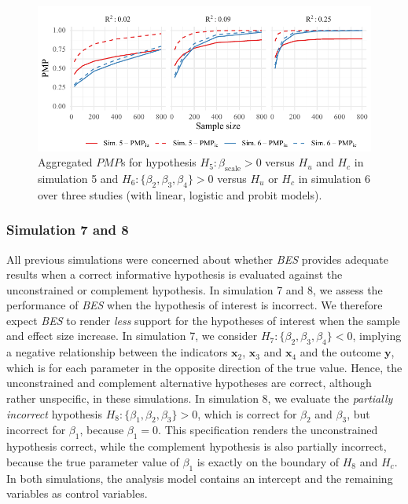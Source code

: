 \documentclass[
]{article}
\begin{document}
\begin{figure}[!t]

{\centering \includegraphics[width=1\textwidth,height=\textheight]{manuscript_VK_files/figure-pdf/fig-PMP56-1.pdf}

}

\caption{\label{fig-PMP56}Aggregated \(PMP\)s for hypothesis
\(H_5: \beta_{\text{scale}} > 0\) versus \(H_u\) and \(H_c\) in
simulation 5 and \(H_6: \{\beta_2, \beta_3, \beta_4\} > 0\) versus
\(H_u\) or \(H_c\) in simulation 6 over three studies (with linear,
logistic and probit models).}

\end{figure}

\hypertarget{simulation-7-and-8}{%
\subsubsection{Simulation 7 and 8}\label{simulation-7-and-8}}

All previous simulations were concerned about whether \emph{BES}
provides adequate results when a correct informative hypothesis is
evaluated against the unconstrained or complement hypothesis. In
simulation 7 and 8, we assess the performance of \emph{BES} when the
hypothesis of interest is incorrect. We therefore expect \emph{BES} to
render \emph{less} support for the hypotheses of interest when the
sample and effect size increase. In simulation 7, we consider
\(H_7: \{\beta_2, \beta_3, \beta_4\} < 0\), implying a negative
relationship between the indicators \(\boldsymbol{x}_2\),
\(\boldsymbol{x}_3\) and \(\boldsymbol{x}_4\) and the outcome
\(\boldsymbol{y}\), which is for each parameter in the opposite
direction of the true value. Hence, the unconstrained and complement
alternative hypotheses are correct, although rather unspecific, in these
simulations. In simulation 8, we evaluate the \emph{partially incorrect}
hypothesis \(H_8: \{\beta_1, \beta_2, \beta_3\} > 0\), which is correct
for \(\beta_2\) and \(\beta_3\), but incorrect for \(\beta_1\), because
\(\beta_1 = 0\). This specification renders the unconstrained hypothesis
correct, while the complement hypothesis is also partially incorrect,
because the true parameter value of \(\beta_1\) is exactly on the
boundary of \(H_8\) and \(H_c\). In both simulations, the analysis model
contains an intercept and the remaining variables as control variables.
\end{document}
